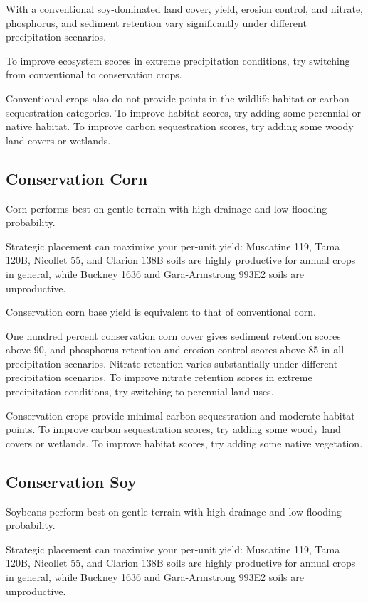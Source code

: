 \documentclass[11pt]{article}
\begin{document}
With a conventional soy-dominated land cover, yield, erosion control, and nitrate, phosphorus, and sediment retention vary significantly under different precipitation scenarios. 

To improve ecosystem scores in extreme precipitation conditions, try switching from conventional to conservation crops.

Conventional crops also do not provide points in the wildlife habitat or carbon sequestration categories. To improve habitat scores, try adding some perennial or native habitat. To improve carbon sequestration scores, try adding some woody land covers or wetlands.

\subsection{Conservation Corn}

Corn performs best on gentle terrain with high drainage and low flooding probability. 

Strategic placement can maximize your per-unit yield: Muscatine 119, Tama 120B, Nicollet 55, and Clarion 138B soils are highly productive for annual crops in general, while Buckney 1636 and Gara-Armstrong 993E2 soils are unproductive.

Conservation corn base yield is equivalent to that of conventional corn.

One hundred percent conservation corn cover gives sediment retention scores above 90, and phosphorus retention and erosion control scores above 85 in all precipitation scenarios. Nitrate retention varies substantially under different precipitation scenarios. To improve nitrate retention scores in extreme precipitation conditions, try switching to perennial land uses.

Conservation crops provide minimal carbon sequestration and moderate habitat points. To improve carbon sequestration scores, try adding some woody land covers or wetlands. To improve habitat scores, try adding some native vegetation.

\subsection{Conservation Soy}

Soybeans perform best on gentle terrain with high drainage and low flooding probability. 

Strategic placement can maximize your per-unit yield: Muscatine 119, Tama 120B, Nicollet 55, and Clarion 138B soils are highly productive for annual crops in general, while Buckney 1636 and Gara-Armstrong 993E2 soils are unproductive.
\end{document}
